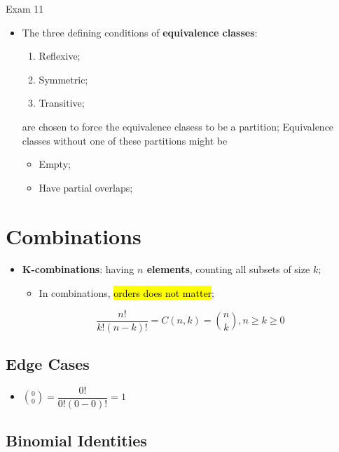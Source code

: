 \documentclass{note}
\begin{document}
\begin{note}{Exam 11}
\begin{itemize}
    \item The three defining conditions of \textbf{equivalence classes}:
    \begin{enumerate}
        \item Reflexive;
        \item Symmetric;
        \item Transitive;
    \end{enumerate}
    are chosen to force the equivalence clasess to be a partition; Equivalence classes without one of these partitions might be 
    \begin{itemize}
        \item Empty;
        \item Have partial overlaps;
    \end{itemize}
\end{itemize}

\section{Combinations}

\begin{itemize}
    \item \textbf{K-combinations}: having \textbf{$ n $ elements}, counting all subsets of size $ k $;
    \begin{itemize}
        \item In combinations, \hl{orders does not matter};
    \end{itemize}
    \begin{equation}
        \frac{n !}{ k! \left( n - k \right) ! } = C \left(n, k \right) = \binom{n}{k}, n \geq k \geq 0
    \end{equation}
\end{itemize}

    \subsection{Edge Cases}
    
    \begin{itemize}
        \item $ \binom{0}{0} = \dfrac{0 !}{0 ! \left( 0 - 0 \right) !} = 1 $
    \end{itemize}
    
    \subsection{Binomial Identities}
    

\end{note}
\end{document}

